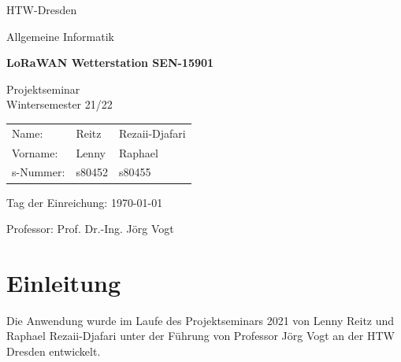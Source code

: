 \documentclass[12pt]{article}
\begin{document}
  \begin{titlepage}

    \begin{center}
      \Huge
  
      HTW-Dresden
  
      Allgemeine Informatik
  
      \bigskip
  
      \LARGE
  
      \vfill
  
      \huge
  
      \textbf{LoRaWAN Wetterstation SEN-15901}
  
      \LARGE
  
      \vfill
  
      Projektseminar\\
      Wintersemester 21/22
  
      \bigskip
  
    \end{center}
  
    \vfill
  
    \Large

  
    \vspace*{2\bigskipamount}
  
    \centering

    \begingroup
      \setlength{\tabcolsep}{12pt}
      \begin{tabular}{lll}
        Name:     & Reitz   & Rezaii-Djafari\\[2.0ex]
        Vorname:  & Lenny   & Raphael\\[2.0ex]
        s-Nummer: & s80452  & s80455
      \end{tabular}
    \endgroup
  
    \vspace*{4\bigskipamount}
  

    Tag der Einreichung: \today
  
    \vspace*{2\bigskipamount}
  
    Professor: Prof. Dr.-Ing. Jörg Vogt 
  
  \end{titlepage}

  \newpage


  \tableofcontents


  \newpage


  \section{Einleitung}
    Die Anwendung wurde im Laufe des Projektseminars 2021 von Lenny Reitz und Raphael Rezaii-Djafari unter der Führung von
    Professor Jörg Vogt an der HTW Dresden entwickelt.
\end{document}

